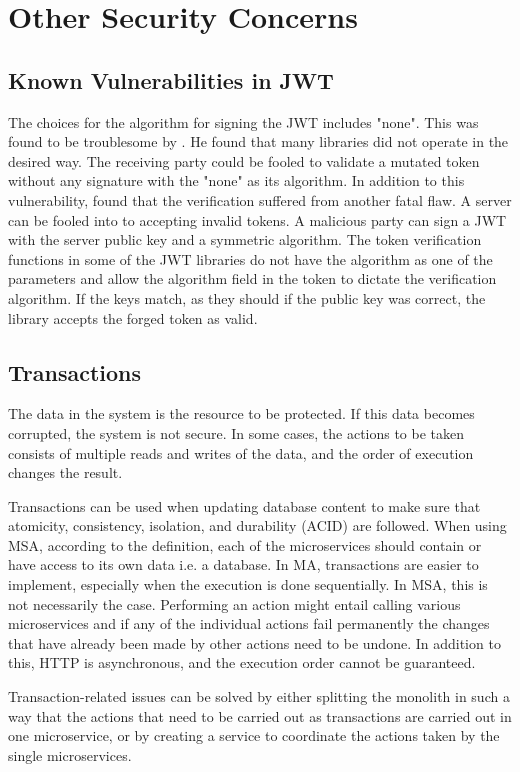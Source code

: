 \section{Other Security Concerns}
\subsection{Known Vulnerabilities in JWT}
\begin{sloppypar}
    The choices for the algorithm for signing the JWT includes "none". This was
    found to be troublesome by \citet{nonejwt}. He found that many libraries did
    not operate in the desired way. The receiving party could be fooled to
    validate a mutated token without any signature with the "none" as its
    algorithm. In addition to this vulnerability, \citet{nonejwt} found that the
    verification suffered from another fatal flaw. A server can be fooled into
    to accepting invalid tokens. A malicious party can sign a JWT with the
    server public key and a symmetric algorithm. The token verification
    functions in some of the JWT libraries do not have the algorithm as one of
    the parameters and allow the algorithm field in the token to dictate the
    verification algorithm. If the keys match, as they should if the public key
    was correct, the library accepts the forged token as valid.
\end{sloppypar}

\subsection{Transactions}
\begin{sloppypar}
    The data in the system is the resource to be protected. If this data becomes
    corrupted, the system is not secure. In some cases, the actions to be taken
    consists of multiple reads and writes of the data, and the order of
    execution changes the result.
\end{sloppypar}
\begin{sloppypar}
    Transactions can be used when updating database content to make sure that
    atomicity, consistency, isolation, and durability (ACID) \citep{acid} are
    followed. When using MSA, according to the definition, each of the
    microservices should contain or have access to its own data i.e. a database.
    In MA, transactions are easier to implement, especially when the execution
    is done sequentially. In MSA, this is not necessarily the case. Performing
    an action might entail calling various microservices and if any of the
    individual actions fail permanently the changes that have already been made
    by other actions need to be undone. In addition to this, HTTP is
    asynchronous, and the execution order cannot be guaranteed.
\end{sloppypar}
\begin{sloppypar}
    Transaction-related issues can be solved by either splitting the monolith
    in such a way that the actions that need to be carried out as transactions
    are carried out in one microservice, or by creating a service to
    coordinate the actions taken by the single microservices.
\end{sloppypar}

